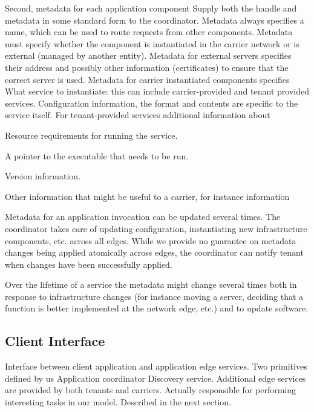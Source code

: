 {\begin{outline}
    \2 Second, metadata for each application component
        \3 Supply both the handle and metadata in some standard form to the coordinator.
        \3 Metadata always specifies a name, which can be used to route requests from other components.
        \3 Metadata must specify whether the component is instantiated in the carrier network or is external (\ie managed by another entity).
        \3 Metadata for external servers specifies their address and possibly other information (certificates) to ensure that the correct server is used.
        \3 Metadata for carrier instantiated components specifies
            \4 What service to instantiate: this can include carrier-provided and tenant provided services.
            \4 Configuration information, the format and contents are specific to the service itself.
            \4 For tenant-provided services additional information about
                 \begin{asparaenum}
                    \item Resource requirements for running the service.
                    \item A pointer to the executable that needs to be run.
                    \item Version information.
                    \item Other information that might be useful to a carrier, for instance information
                 \end{asparaenum}
                 
    \2 Metadata for an application invocation can be updated several times.
        \3 The coordinator takes care of updating configuration, instantiating new infrastructure components, etc. across all
           edges.
        \3 While we provide no guarantee on metadata changes being applied atomically across edges, the coordinator can notify tenant
        when changes have been successfully applied.
        
    \2 Over the lifetime of a service the metadata might change several times both in response to infrastructure changes (for instance moving a server, 
    deciding that a function is better implemented at the network edge, etc.) and to update software.
\end{outline}

\subsection{Client Interface}
\begin{outline}
\1 Interface between client application and application edge services.
\1 Two primitives defined by us
    \2 Application coordinator
    \2 Discovery service.
\1 Additional edge services are provided by both tenants and carriers.
    \2 Actually responsible for performing interesting tasks in our model.
    \2 Described in the next section.
\end{outline}

}
